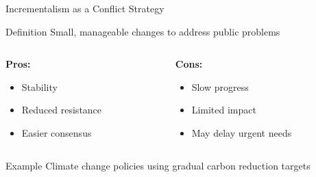\documentclass[10pt]{beamer}
\begin{document}
\begin{frame}{Incrementalism as a Conflict Strategy}
    \begin{block}{Definition}
        Small, manageable changes to address public problems
    \end{block}
    
    \begin{columns}[T]
        \begin{column}{0.5\textwidth}
            \textbf{Pros:}
            \begin{itemize}
                \item Stability
                \item Reduced resistance
                \item Easier consensus
            \end{itemize}
        \end{column}
        \begin{column}{0.5\textwidth}
            \textbf{Cons:}
            \begin{itemize}
                \item Slow progress
                \item Limited impact
                \item May delay urgent needs
            \end{itemize}
        \end{column}
    \end{columns}
    
    \begin{exampleblock}{Example}
        Climate change policies using gradual carbon reduction targets
    \end{exampleblock}
\end{frame}
\end{document}
